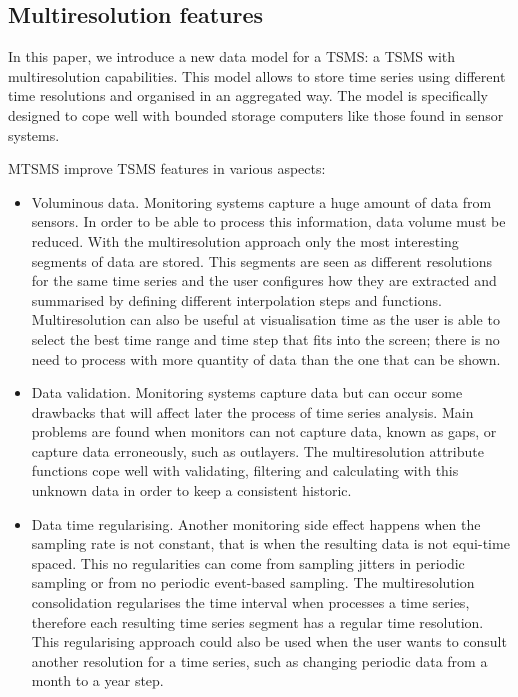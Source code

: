 \subsection{Multiresolution features}

In this paper, we introduce a new data model for a TSMS: a TSMS with
multiresolution capabilities. This model allows to store time series
using different time resolutions and organised in an aggregated way. The
model is specifically designed to cope well with bounded storage
computers like those found in sensor systems.

MTSMS improve TSMS features in various aspects:
\begin{itemize}

\item Voluminous data. Monitoring systems capture a huge amount of
  data from sensors. In order to be able to process this information,
  data volume must be reduced. With the multiresolution approach only
  the most interesting segments of data are stored. This segments are
  seen as different resolutions for the same time series and the user
  configures how they are extracted and summarised by defining
  different interpolation steps and functions. Multiresolution can
  also be useful at visualisation time as the user is able to select
  the best time range and time step that fits into the screen; there
  is no need to process with more quantity of data than the one that
  can be shown.

\item Data validation. Monitoring systems capture data but can occur
  some drawbacks that will affect later the process of time series
  analysis. Main problems are found when monitors can not capture
  data, known as gaps, or capture data erroneously, such as outlayers.
  The multiresolution attribute functions cope well with validating,
  filtering and calculating with this unknown data in order to keep a
  consistent historic.

\item Data time regularising. Another monitoring side effect happens when
  the sampling rate is not constant, that is when the resulting data
  is not equi-time spaced. This no regularities can come from sampling
  jitters in periodic sampling or from no periodic event-based
  sampling. The multiresolution consolidation regularises the time
  interval when processes a time series, therefore each resulting time
  series segment has a regular time resolution. This regularising
  approach could also be used when the user wants to consult another
  resolution for a time series, such as changing periodic data from a
  month to a year step.


\end{itemize}
